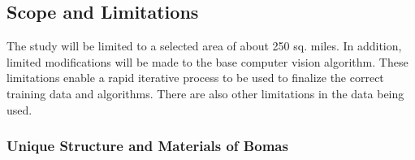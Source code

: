 \documentclass[10pt]{article}
\begin{document}






\subsection{Scope and Limitations}

The study will be limited to a selected area of about 250 sq. miles. In addition, limited modifications will be made to the base computer vision algorithm. These limitations enable a rapid iterative process to be used to finalize the correct training data and algorithms. There are also other limitations in the data being used.

\subsubsection{Unique Structure and Materials of Bomas}
\end{document}
